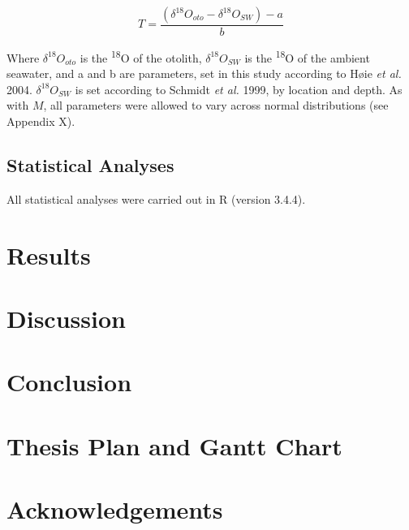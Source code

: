 \documentclass[12pt, titlepage]{article}
\begin{document}
\begin{equation}
T = \frac{(\delta^{18}O_{oto} - \delta^{18}O_{SW}) - a}{b}
\end{equation}

\noindent Where $\delta^{18}O_{oto}$ is the \textdelta \textsuperscript{18}O of the otolith, $\delta^{18}O_{SW}$ is the \textdelta \textsuperscript{18}O of the ambient seawater, and a and b are parameters, set in this study according to H{\o}ie \textit{et al.} 2004. $\delta^{18}O_{SW}$  is set according to Schmidt \textit{et al.} 1999, by location and depth. 
As with $M$, all parameters were allowed to vary across normal distributions (see Appendix X). %

\subsection{Statistical Analyses}

All statistical analyses were carried out in R (version 3.4.4). 

\section{Results}

\section{Discussion}

\section{Conclusion}

\section{Thesis Plan and Gantt Chart}

\section{Acknowledgements}
\end{document}
